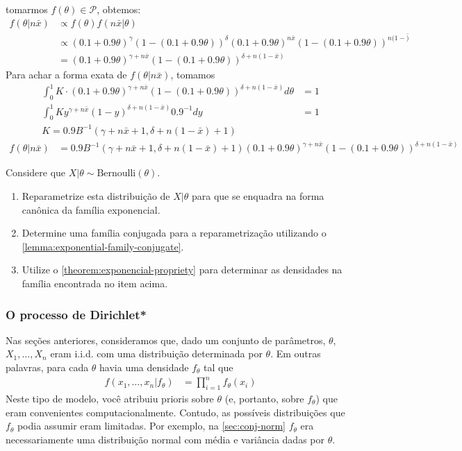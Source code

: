 {\begin{enumerate}[label=(\alph*)]
  tomarmos $f(\theta) \in \mathcal{P}$, obtemos:
  \begin{align*}
   f(\theta|n\bar{x})
   &\propto f(\theta)f(n\bar{x}|\theta)	\\
   &\propto (0.1+0.9\theta)^{\gamma}(1-(0.1+0.9\theta))^{\delta}(0.1+0.9\theta)^{n\bar{x}}(1-(0.1+0.9\theta))^{n(1-\bar)} \\
   &= (0.1+0.9\theta)^{\gamma+n\bar{x}}(1-(0.1+0.9\theta))^{\delta+n(1-\bar{x})}
  \end{align*}
  Para achar a forma exata de
  $f(\theta|n\bar{x})$, tomamos
  \begin{align*}
   \int_{0}^{1}{K \cdot (0.1+0.9\theta)^{\gamma+n\bar{x}}(1-(0.1+0.9\theta))^{\delta+n(1-\bar{x})} d\theta} &= 1 \\
   \int_{0}^{1}{K y^{\gamma+n\bar{x}}(1-y)^{\delta+n(1-\bar{x})} 0.9^{-1} dy} &= 1 \\
   K = 0.9B^{-1}(\gamma+n\bar{x}+1,\delta+n(1-\bar{x})+1)
  \end{align*}
  \begin{align*}
   f(\theta|n\bar{x})
   &= 0.9B^{-1}(\gamma+n\bar{x}+1,\delta+n(1-\bar{x})+1)(0.1+0.9\theta)^{\gamma+n\bar{x}}(1-(0.1+0.9\theta))^{\delta+n(1-\bar{x})}
  \end{align*}
 \end{enumerate}
}{}

\begin{exercise}
 Considere que $X|\theta \sim \text{Bernoulli}(\theta)$.
 \begin{enumerate}[label=(\alph*)]
  \item Reparametrize esta  distribuição de $X|\theta$ para
  que se enquadra na forma canônica da família exponencial.
  \item Determine uma família conjugada para a reparametrização
  utilizando o \cref{lemma:exponential-family-conjugate}.
  \item Utilize o \cref{theorem:exponencial-propriety} para
  determinar as densidades na família encontrada no item acima.
 \end{enumerate}
\end{exercise}

\subsubsection{O processo de Dirichlet*}

Nas seções anteriores, consideramos que,
dado um conjunto de parâmetros, $\theta$,
$X_1, \ldots, X_n$ eram i.i.d. com
uma distribuição determinada por $\theta$.
Em outras palavras, 
para cada $\theta$ havia uma densidade
$f_{\theta}$ tal que
\begin{align*}
 f(x_1,\ldots,x_n|f_{\theta})
 &= \prod_{i=1}^{n}f_{\theta}(x_i)
\end{align*}
Neste tipo de modelo,
você atribuiu prioris sobre
$\theta$ (e, portanto, sobre $f_{\theta}$) que
eram convenientes computacionalmente.
Contudo, as possíveis distribuições que
$f_{\theta}$ podia assumir eram limitadas.
Por exemplo, na \cref{sec:conj-norm}
$f_{\theta}$ era necessariamente 
uma distribuição normal
com média e variância dadas por $\theta$.

